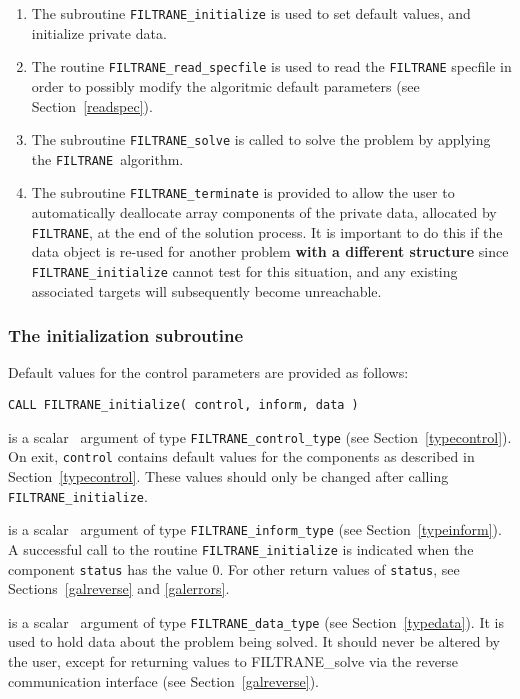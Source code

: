 \documentclass{galahad}
\newcommand{\packagename}{FILTRANE}
\newcommand{\filtrane}{{\tt \packagename}}
\begin{document}
\begin{enumerate}
\item The subroutine {\tt \packagename\_initialize} 
      is used to set default values, and initialize private data. 
\item The routine {\tt \packagename\_read\_specfile}
      is used to read the {\tt \packagename} specfile in order to
      possibly modify the algoritmic default parameters (see
      Section~\ref{readspec}). 
\item The subroutine {\tt \packagename\_solve} 
      is called to solve the problem by applying the \filtrane\ algorithm.
\item The subroutine {\tt \packagename\_terminate} 
      is provided to allow the user to automatically deallocate array 
      components of the private data, allocated by 
      {\tt \packagename}, at the end of the solution process. 
      It is important to do this if the data object is re-used for another 
      problem {\bf with a different structure}
      since {\tt \packagename\_initialize} cannot test for this situation, 
      and any existing associated targets will subsequently become unreachable.
\end{enumerate}


\subsubsection{The initialization subroutine}\label{subinit}

Default values for the control parameters are provided as follows:
\vspace*{1mm}

\hspace{8mm}
{\tt CALL \packagename\_initialize( control, inform, data )}

\begin{description}
 is a scalar \intentout\ argument of type 
{\tt \packagename\_control\_type}
(see Section~\ref{typecontrol}). 
On exit, {\tt control} contains default values for the components as
described in Section~\ref{typecontrol}.
These values should only be changed after calling 
{\tt \packagename\_initialize}.

 is a scalar \intentout\ argument of type 
{\tt \packagename\_inform\_type} (see Section~\ref{typeinform}).  
A successful call to the routine {\tt \packagename\_initialize}
is indicated when the  component {\tt status} has the value 0. 
For other return values of {\tt status}, see Sections~\ref{galreverse} and
\ref{galerrors}.

 is a scalar \intentout\ argument of type 
{\tt \packagename\_data\_type}
(see Section~\ref{typedata}). It is used to hold data about the problem being 
solved. It should never be altered by the user, except for returning values to
\packagename\_solve via the reverse communication interface (see
Section~\ref{galreverse}).
\end{description}
\end{document}
